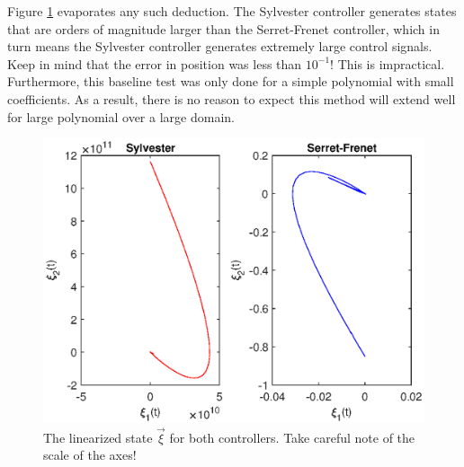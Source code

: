 \documentclass[oneside, 11pt]{book}
\begin{document}
Figure \ref{fig:tfl_compare_state} evaporates any such deduction. The Sylvester controller generates states that are orders of magnitude larger than the Serret-Frenet controller, which in turn means the Sylvester controller generates extremely large control signals. Keep in mind that the error in position was less than $10^{-1}$! This is impractical. Furthermore, this baseline test was only done for a simple polynomial with small coefficients. As a result, there is no reason to expect this method will extend well for large polynomial over a large domain.

\begin{figure}[!htbp]
    \centering
    \includegraphics{images/tfl_compare_state.eps}
    \caption{The linearized state $\vec{\xi}$ for both controllers. Take careful note of the scale of the axes!}
    \label{fig:tfl_compare_state}
\end{figure}
\end{document}
